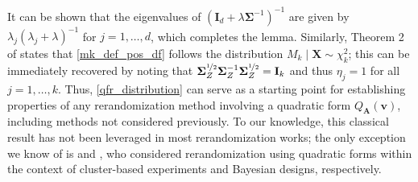 \documentclass[11pt,twoside]{article}
\theoremstyle{definition}
\theoremstyle{remark}
\begin{document}
It can be shown that the eigenvalues of $(\mathbf{I}_d + \lambda \mathbf{\Sigma}^{-1})^{-1}$ are given by $\lambda_j (\lambda_j + \lambda)^{-1}$ for $j = 1, \ldots, d$, which completes the lemma. Similarly, Theorem 2 of \cite{zhang2023pca} states that \cref{mk_def_pos_df} follows the distribution $M_k \mid \mathbf{X} \sim \chi^2_k$; this can be immediately recovered by noting that $\mathbf{\Sigma}^{\nicefrac{1}{2}}_Z \mathbf{\Sigma}^{-1}_Z \mathbf{\Sigma}^{\nicefrac{1}{2}}_Z = \mathbf{I}_k$ and thus $\eta_j = 1$ for all $j = 1,\ldots,k$. Thus, \cref{qfr_distribution} can serve as a starting point for establishing properties of any rerandomization method involving a quadratic form $Q_{\mathbf{A}}(\mathbf{v})$, including methods not considered previously. To our knowledge, this classical result has not been leveraged in most rerandomization works; the only exception we know of is \cite{lu2023design} and \cite{liu2023bayesian}, who considered rerandomization using quadratic forms within the context of cluster-based experiments and Bayesian designs, respectively.
\end{document}
